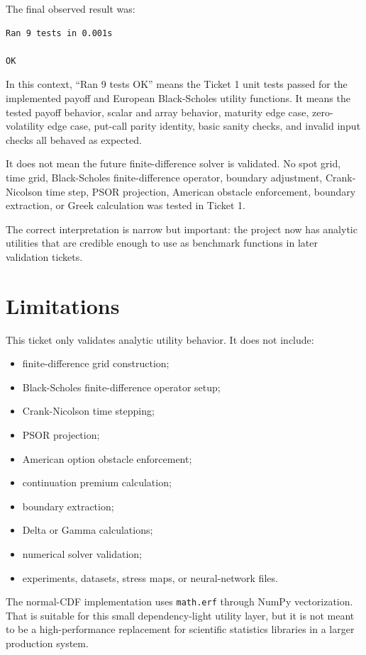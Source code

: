 \documentclass[11pt,a4paper]{article}
\newcommand{\code}[1]{\texttt{#1}}
\begin{document}
The final observed result was:
\begin{lstlisting}
Ran 9 tests in 0.001s

OK
\end{lstlisting}

In this context, ``Ran 9 tests OK'' means the Ticket 1 unit tests passed for the implemented payoff
and European Black-Scholes utility functions. It means the tested payoff behavior, scalar and array
behavior, maturity edge case, zero-volatility edge case, put-call parity identity, basic sanity
checks, and invalid input checks all behaved as expected.

It does not mean the future finite-difference solver is validated. No spot grid, time grid,
Black-Scholes finite-difference operator, boundary adjustment, Crank-Nicolson time step, PSOR
projection, American obstacle enforcement, boundary extraction, or Greek calculation was tested in
Ticket 1.

The correct interpretation is narrow but important: the project now has analytic utilities that
are credible enough to use as benchmark functions in later validation tickets.

\section{Limitations}

This ticket only validates analytic utility behavior. It does not include:
\begin{itemize}
  \item finite-difference grid construction;
  \item Black-Scholes finite-difference operator setup;
  \item Crank-Nicolson time stepping;
  \item PSOR projection;
  \item American option obstacle enforcement;
  \item continuation premium calculation;
  \item boundary extraction;
  \item Delta or Gamma calculations;
  \item numerical solver validation;
  \item experiments, datasets, stress maps, or neural-network files.
\end{itemize}

The normal-CDF implementation uses \code{math.erf} through NumPy vectorization. That is suitable
for this small dependency-light utility layer, but it is not meant to be a high-performance
replacement for scientific statistics libraries in a larger production system.
\end{document}
